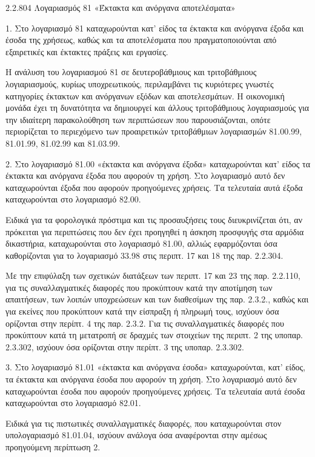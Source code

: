 \documentclass[A4,10pt,greek]{book}
\begin{document}
2.2.804 Λογαριασμός 81 «Έκτακτα και ανόργανα αποτελέσματα»

1. Στο λογαριασμό 81 καταχωρούνται κατ' είδος τα έκτακτα και ανόργανα έξοδα και έσοδα της χρήσεως, καθώς και τα αποτελέσματα που πραγματοποιούνται από εξαιρετικές και έκτακτες πράξεις και εργασίες.

Η ανάλυση του λογαριασμού 81 σε δευτεροβάθμιους και τριτοβάθμιους λογιαριασμούς, κυρίως υποχρεωτικούς, περιλαμβάνει τις κυριότερες γνωστές κατηγορίες έκτακτων και ανόργανων εξόδων και αποτελεσμάτων. Η οικονομική μονάδα έχει τη δυνατότητα να δημιουργεί και άλλους τριτοβάθμιους λογαριασμούς για την ιδιαίτερη παρακολούθηση των περιπτώσεων που παρουσιάζονται, οπότε περιορίζεται το περιεχόμενο των προαιρετικών τριτοβάθμιων λογαριασμών 81.00.99, 81.01.99, 81.02.99 και 81.03.99.

2. Στο λογαριασμό 81.00 «έκτακτα και ανόργανα έξοδα» καταχωρούνται κατ' είδος τα έκτακτα και ανόργανα έξοδα που αφορούν τη χρήση. Στο λογαριασμό αυτό δεν καταχωρούνται έξοδα που αφορούν προηγούμενες χρήσεις. Τα τελευταία αυτά έξοδα καταχωρούνται στο λογαριασμό 82.00.

Ειδικά για τα φορολογικά πρόστιμα και τις προσαυξήσεις τους διευκρινίζεται ότι, αν πρόκειται για περιπτώσεις που δεν έχει προηγηθεί η άσκηση προσφυγής στα αρμόδια δικαστήρια, καταχωρούνται στο λογαριασμό 81.00, αλλιώς εφαρμόζονται όσα καθορίζονται για το λογαριασμό 33.98 στις περιπτ. 17 και 18 της παρ.  2.2.304.

Με την επιφύλαξη των σχετικών διατάξεων των περιπτ. 17 και 23 της παρ. 2.2.110, για τις συναλλαγματικές διαφορές που προκύπτουν κατά την αποτίμηση των απαιτήσεων, των λοιπών υποχρεώσεων και των διαθεσίμων της παρ. 2.3.2., καθώς και για εκείνες που προκύπτουν κατά την είσπραξη ή πληρωμή τους, ισχύουν όσα ορίζονται στην περίπτ. 4 της παρ. 2.3.2. Για τις συναλλαγματικές διαφορές που προκύπτουν κατά τη μετατροπή σε δραχμές των στοιχείων της περιπτ. 2 της υποπαρ.  2.3.302, ισχύουν όσα ορίζονται στην περίπτ. 3 της υποπαρ. 2.3.302.

3. Στο λογαριασμό 81.01 «έκτακτα και ανόργανα έσοδα» καταχωρούνται, κατ' είδος, τα έκτακτα και ανόργανα έσοδα που αφορούν τη χρήση. Στο λογαριασμό αυτό δεν καταχωρούνται έσοδα που αφορούν προηγούμενες χρήσεις. Τα τελευταία αυτά έσοδα καταχωρούνται στο λογαριασμό 82.01.

Ειδικά για τις πιστωτικές συναλλαγματικές διαφορές, που καταχωρούνται στον υπολογαριασμό 81.01.04, ισχύουν ανάλογα όσα αναφέρονται στην αμέσως προηγούμενη περίπτωση 2.
\end{document}
